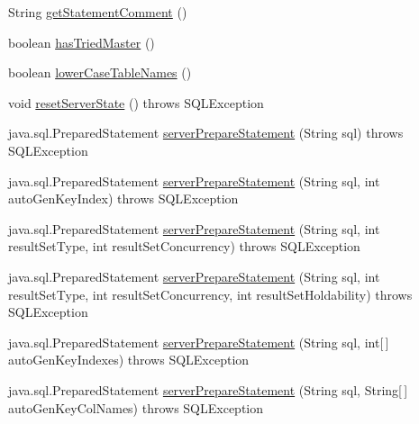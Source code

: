 \begin{DoxyCompactItemize}
\item 
String \mbox{\hyperlink{classcom_1_1mysql_1_1cj_1_1jdbc_1_1_connection_wrapper_a4fefdf8c3a3be123e8391959185cde40}{get\+Statement\+Comment}} ()
\item 
boolean \mbox{\hyperlink{classcom_1_1mysql_1_1cj_1_1jdbc_1_1_connection_wrapper_a38b81e539492d555536e40cc39bca55b}{has\+Tried\+Master}} ()
\item 
boolean \mbox{\hyperlink{classcom_1_1mysql_1_1cj_1_1jdbc_1_1_connection_wrapper_aba2642633d16efa8be0fd109c0fa9747}{lower\+Case\+Table\+Names}} ()
\item 
void \mbox{\hyperlink{classcom_1_1mysql_1_1cj_1_1jdbc_1_1_connection_wrapper_a420204849914ad076e502ba7753ba6b5}{reset\+Server\+State}} ()  throws S\+Q\+L\+Exception 
\item 
java.\+sql.\+Prepared\+Statement \mbox{\hyperlink{classcom_1_1mysql_1_1cj_1_1jdbc_1_1_connection_wrapper_aa430608c339c22aff456a59210faaf8b}{server\+Prepare\+Statement}} (String sql)  throws S\+Q\+L\+Exception 
\item 
java.\+sql.\+Prepared\+Statement \mbox{\hyperlink{classcom_1_1mysql_1_1cj_1_1jdbc_1_1_connection_wrapper_a86037101987ec03d10b75dbba23a8dff}{server\+Prepare\+Statement}} (String sql, int auto\+Gen\+Key\+Index)  throws S\+Q\+L\+Exception 
\item 
java.\+sql.\+Prepared\+Statement \mbox{\hyperlink{classcom_1_1mysql_1_1cj_1_1jdbc_1_1_connection_wrapper_a764bc7940c1fb384724ba3bc18572978}{server\+Prepare\+Statement}} (String sql, int result\+Set\+Type, int result\+Set\+Concurrency)  throws S\+Q\+L\+Exception 
\item 
java.\+sql.\+Prepared\+Statement \mbox{\hyperlink{classcom_1_1mysql_1_1cj_1_1jdbc_1_1_connection_wrapper_a64bd494b5f5ad72d744fcc7236a5501d}{server\+Prepare\+Statement}} (String sql, int result\+Set\+Type, int result\+Set\+Concurrency, int result\+Set\+Holdability)  throws S\+Q\+L\+Exception 
\item 
java.\+sql.\+Prepared\+Statement \mbox{\hyperlink{classcom_1_1mysql_1_1cj_1_1jdbc_1_1_connection_wrapper_a9ae046833df9f5a89755a54dd65d43b0}{server\+Prepare\+Statement}} (String sql, int\mbox{[}$\,$\mbox{]} auto\+Gen\+Key\+Indexes)  throws S\+Q\+L\+Exception 
\item 
java.\+sql.\+Prepared\+Statement \mbox{\hyperlink{classcom_1_1mysql_1_1cj_1_1jdbc_1_1_connection_wrapper_a02f353527ecf3306019227fa68d014a7}{server\+Prepare\+Statement}} (String sql, String\mbox{[}$\,$\mbox{]} auto\+Gen\+Key\+Col\+Names)  throws S\+Q\+L\+Exception 
\item 

\end{DoxyCompactItemize}
